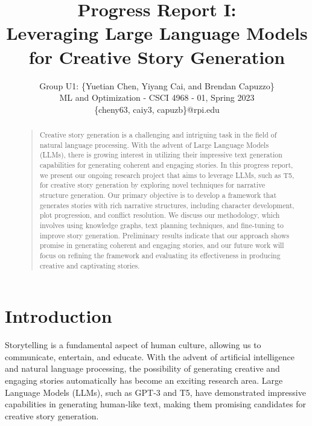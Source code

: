 \documentclass[letterpaper]{article}
\begin{document}
%
\title{Progress Report I: \\ Leveraging Large Language Models for Creative Story Generation}
\author{Group U1: \{Yuetian Chen, Yiyang Cai, and Brendan Capuzzo\}\\
ML and Optimization - CSCI 4968 - 01, Spring 2023\\
\{cheny63, caiy3, capuzb\}@rpi.edu\\
}
\maketitle
\begin{abstract}
\begin{quote}
Creative story generation is a challenging and intriguing task in the field of natural language processing. With the advent of Large Language Models (LLMs), there is growing interest in utilizing their impressive text generation capabilities for generating coherent and engaging stories. In this progress report, we present our ongoing research project that aims to leverage LLMs, such as T5, for creative story generation by exploring novel techniques for narrative structure generation. Our primary objective is to develop a framework that generates stories with rich narrative structures, including character development, plot progression, and conflict resolution. We discuss our methodology, which involves using knowledge graphs, text planning techniques, and fine-tuning to improve story generation. Preliminary results indicate that our approach shows promise in generating coherent and engaging stories, and our future work will focus on refining the framework and evaluating its effectiveness in producing creative and captivating stories.
\end{quote}
\end{abstract}

\section{Introduction}
Storytelling is a fundamental aspect of human culture, allowing us to communicate, entertain, and educate. With the advent of artificial intelligence and natural language processing, the possibility of generating creative and engaging stories automatically has become an exciting research area. Large Language Models (LLMs), such as GPT-3 and T5, have demonstrated impressive capabilities in generating human-like text, making them promising candidates for creative story generation.
\end{document}
